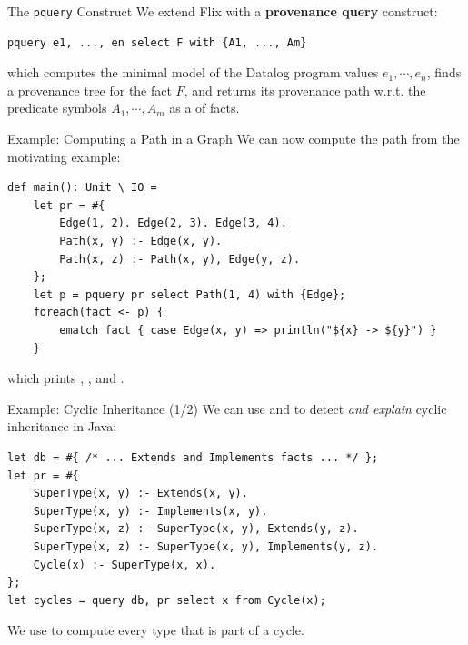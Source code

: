 \begin{frame}[fragile]{The \texttt{pquery} Construct}
We extend Flix with a \textbf{provenance query} construct:

\begin{lstlisting}[language=flix, xleftmargin=0.8cm]
pquery e1, ..., en select F with {A1, ..., Am}
\end{lstlisting}

which computes the minimal model of the Datalog program values $e_1, \cdots,
e_n$, finds a provenance tree for the fact $F$, and returns its provenance path
w.r.t. the predicate symbols $A_1, \cdots, A_m$ as a  of facts.
\end{frame}

\begin{frame}[fragile]{Example: Computing a Path in a Graph}
We can now compute the path from the motivating example:

\begin{lstlisting}[language=flix, xleftmargin=0.8cm]
def main(): Unit \ IO =
    let pr = #{
        Edge(1, 2). Edge(2, 3). Edge(3, 4).
        Path(x, y) :- Edge(x, y).
        Path(x, z) :- Path(x, y), Edge(y, z).
    };
    let p = pquery pr select Path(1, 4) with {Edge};
    foreach(fact <- p) {
        ematch fact { case Edge(x, y) => println("${x} -> ${y}") }
    }
\end{lstlisting}

which prints , , and .
\end{frame}

\begin{frame}[fragile]{Example: Cyclic Inheritance (1/2)}
We can use  and  to detect \emph{and explain} cyclic
inheritance in Java:

\begin{lstlisting}[language=flix, xleftmargin=0.8cm]
let db = #{ /* ... Extends and Implements facts ... */ };
let pr = #{
    SuperType(x, y) :- Extends(x, y).
    SuperType(x, y) :- Implements(x, y).
    SuperType(x, z) :- SuperType(x, y), Extends(y, z).
    SuperType(x, z) :- SuperType(x, y), Implements(y, z).
    Cycle(x) :- SuperType(x, x).
};
let cycles = query db, pr select x from Cycle(x);
\end{lstlisting}

We use  to compute every type that is part of a cycle.
\end{frame}

